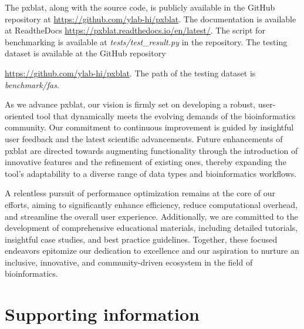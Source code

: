 \documentclass[10pt,letterpaper]{article}
\begin{document}
The \gls{pxblat}, along with the source code, is publicly available in the GitHub repository at \url{https://github.com/ylab-hi/pxblat}.
The documentation is available at ReadtheDocs \url{https://pxblat.readthedocs.io/en/latest/}.
The script for benchmarking is available at \emph{tests/test\_result.py} in the repository.
The testing dataset is available at the GitHub repository {\url{https://github.com/ylab-hi/pxblat}.
The path of the testing dataset is \emph{benchmark/fas}.

As we advance \gls{pxblat}, our vision is firmly set on developing a robust, user-oriented tool that dynamically meets the evolving demands of the bioinformatics community.
Our commitment to continuous improvement is guided by insightful user feedback and the latest scientific advancements.
Future enhancements of \gls{pxblat} are directed towards augmenting functionality through the introduction of innovative features and the refinement of existing ones, thereby expanding the tool's adaptability to a diverse range of data types and bioinformatics workflows.

A relentless pursuit of performance optimization remains at the core of our efforts, aiming to significantly enhance efficiency, reduce computational overhead, and streamline the overall user experience.
Additionally, we are committed to the development of comprehensive educational materials, including detailed tutorials, insightful case studies, and best practice guidelines.
Together, these focused endeavors epitomize our dedication to excellence and our aspiration to nurture an inclusive, innovative, and community-driven ecosystem in the field of bioinformatics.

%


\section*{Supporting information}

}
\end{document}
